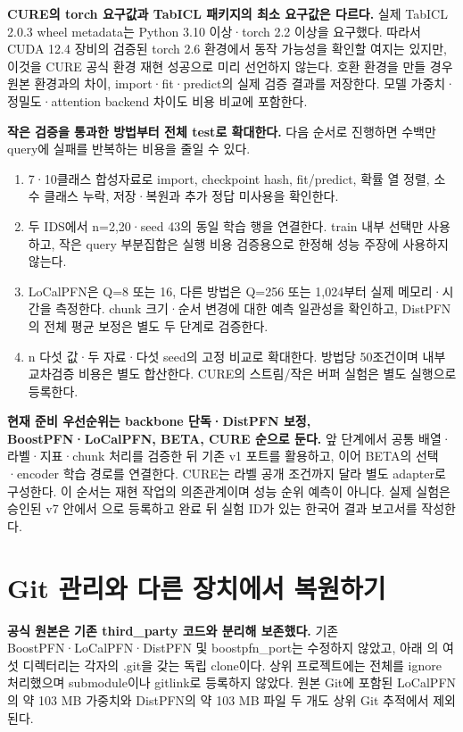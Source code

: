\textbf{CURE의 torch 요구값과 TabICL 패키지의 최소 요구값은 다르다.} 실제 TabICL 2.0.3 wheel metadata는 Python 3.10 이상·torch 2.2 이상을 요구했다. 따라서 CUDA 12.4 장비의 검증된 torch 2.6 환경에서 동작 가능성을 확인할 여지는 있지만, 이것을 CURE 공식 환경 재현 성공으로 미리 선언하지 않는다. 호환 환경을 만들 경우 원본 환경과의 차이, import·fit·predict의 실제 검증 결과를 저장한다. 모델 가중치·정밀도·attention backend 차이도 비용 비교에 포함한다.

\textbf{작은 검증을 통과한 방법부터 전체 test로 확대한다.} 다음 순서로 진행하면 수백만 query에 실패를 반복하는 비용을 줄일 수 있다.
\begin{enumerate}[leftmargin=*]
\item 7·10클래스 합성자료로 import, checkpoint hash, fit/predict, 확률 열 정렬, 소수 클래스 누락, 저장·복원과 추가 정답 미사용을 확인한다.
\item 두 IDS에서 n=2,20·seed 43의 동일 학습 행을 연결한다. train 내부 선택만 사용하고, 작은 query 부분집합은 실행 비용 검증용으로 한정해 성능 주장에 사용하지 않는다.
\item LoCalPFN은 Q=8 또는 16, 다른 방법은 Q=256 또는 1,024부터 실제 메모리·시간을 측정한다. chunk 크기·순서 변경에 대한 예측 일관성을 확인하고, DistPFN의 전체 평균 보정은 별도 두 단계로 검증한다.
\item n 다섯 값·두 자료·다섯 seed의 고정 비교로 확대한다. 방법당 50조건이며 내부 교차검증 비용은 별도 합산한다. CURE의 스트림/작은 버퍼 실험은 별도 실행으로 등록한다.
\end{enumerate}

\textbf{현재 준비 우선순위는 backbone 단독·DistPFN 보정, BoostPFN·LoCalPFN, BETA, CURE 순으로 둔다.} 앞 단계에서 공통 배열·라벨·지표·chunk 처리를 검증한 뒤 기존 v1 포트를 활용하고, 이어 BETA의 선택·encoder 학습 경로를 연결한다. CURE는 라벨 공개 조건까지 달라 별도 adapter로 구성한다. 이 순서는 재현 작업의 의존관계이며 성능 순위 예측이 아니다. 실제 실험은 승인된 v7 안에서 으로 등록하고 완료 뒤 실험 ID가 있는 한국어 결과 보고서를 작성한다.

\section{Git 관리와 다른 장치에서 복원하기}
\textbf{공식 원본은 기존 third\_party 코드와 분리해 보존했다.} 기존 BoostPFN·LoCalPFN·DistPFN 및 boostpfn\_port는 수정하지 않았고, 아래 의 여섯 디렉터리는 각자의 .git을 갖는 독립 clone이다. 상위 프로젝트에는  전체를 ignore 처리했으며 submodule이나 gitlink로 등록하지 않았다. 원본 Git에 포함된 LoCalPFN의 약 103 MB 가중치와 DistPFN의 약 103 MB 파일 두 개도 상위 Git 추적에서 제외된다.

